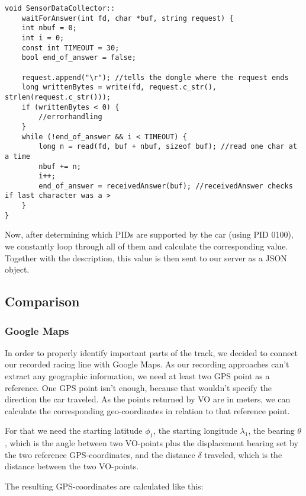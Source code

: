 \begin{lstlisting}
void SensorDataCollector::
	waitForAnswer(int fd, char *buf, string request) {
	int nbuf = 0;
	int i = 0;
	const int TIMEOUT = 30;
	bool end_of_answer = false;

	request.append("\r"); //tells the dongle where the request ends
	long writtenBytes = write(fd, request.c_str(), strlen(request.c_str()));
	if (writtenBytes < 0) {
		//errorhandling
	}
	while (!end_of_answer && i < TIMEOUT) {
		long n = read(fd, buf + nbuf, sizeof buf); //read one char at a time
		nbuf += n;
		i++;
		end_of_answer = receivedAnswer(buf); //receivedAnswer checks if last character was a >
	}
}
\end{lstlisting}

Now, after determining which PIDs are supported by the car (using PID 0100), we constantly loop through all of them and calculate the corresponding value. Together with the description, this value is then sent to our server as a JSON object.

\subsection{Comparison}
\subsubsection{Google Maps}
In order to properly identify important parts of the track, we decided to connect our recorded racing line with Google Maps. As our recording approaches can't extract any geographic information, we need at least two GPS point as a reference. One GPS point isn't enough, because that wouldn't specify the direction the car traveled. As the points returned by VO are in meters, we can calculate the corresponding geo-coordinates in relation to that reference point. 

For that we need the starting latitude $\phi_1$, the starting longitude $\lambda_1$, the bearing $\theta$, which is the angle between two VO-points plus the displacement bearing set by the two reference GPS-coordinates, and the distance $\delta$ traveled, which is the distance between the two VO-points.

The resulting GPS-coordinates are calculated like this:

